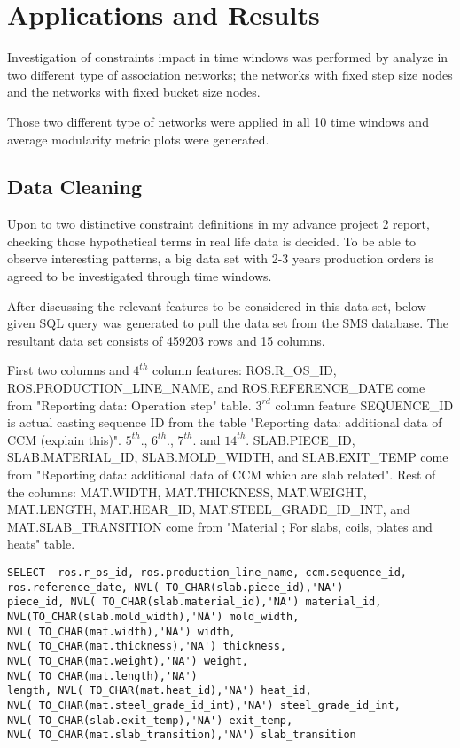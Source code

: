 \chapter{Applications and Results}
{\color{red} 
Investigation of constraints impact in time windows was performed by analyze in two different type of association networks; the networks with fixed step size nodes and the networks with fixed bucket size nodes.

Those two different type of networks were applied in all 10 time windows and average modularity metric plots were generated. 
}
\section{Data Cleaning}
{\color{red}
	Upon to two distinctive constraint definitions in my advance project 2 report, checking those hypothetical terms in real life data is decided. To be able to observe interesting patterns, a big data set with 2-3 years production orders is agreed to be investigated through time windows. 

After discussing the relevant features to be considered in this data set, below given SQL query was generated to pull the data set from the SMS database. The resultant data set consists of 459203 rows and 15 columns. 

First two columns and $4^{th}$ column features: ROS.R\_OS\_ID, ROS.PRODUCTION\_LINE\_NAME, and ROS.REFERENCE\_DATE come from "Reporting data: Operation step" table. $3^{rd}$ column feature SEQUENCE\_ID is actual casting sequence ID from the table "Reporting data: additional data of CCM (explain this)". $5^{th}$., $6^{th}$., $7^{th}$. and $14^{th}$. SLAB.PIECE\_ID, SLAB.MATERIAL\_ID, SLAB.MOLD\_WIDTH, and SLAB.EXIT\_TEMP come from "Reporting data: additional data of CCM which are slab related". Rest of the columns: MAT.WIDTH, MAT.THICKNESS, MAT.WEIGHT, MAT.LENGTH, MAT.HEAR\_ID, MAT.STEEL\_GRADE\_ID\_INT, and MAT.SLAB\_TRANSITION come from "Material ;  For slabs, coils, plates and heats" table.

\begin{lstlisting}
SELECT  ros.r_os_id, ros.production_line_name, ccm.sequence_id,        
ros.reference_date, NVL( TO_CHAR(slab.piece_id),'NA') 
piece_id, NVL( TO_CHAR(slab.material_id),'NA') material_id, 
NVL(TO_CHAR(slab.mold_width),'NA') mold_width, 
NVL( TO_CHAR(mat.width),'NA') width, 
NVL( TO_CHAR(mat.thickness),'NA') thickness, 
NVL( TO_CHAR(mat.weight),'NA') weight, 
NVL( TO_CHAR(mat.length),'NA')
length, NVL( TO_CHAR(mat.heat_id),'NA') heat_id, 
NVL( TO_CHAR(mat.steel_grade_id_int),'NA') steel_grade_id_int, 
NVL( TO_CHAR(slab.exit_temp),'NA') exit_temp, 
NVL( TO_CHAR(mat.slab_transition),'NA') slab_transition
	

\end{lstlisting}}
